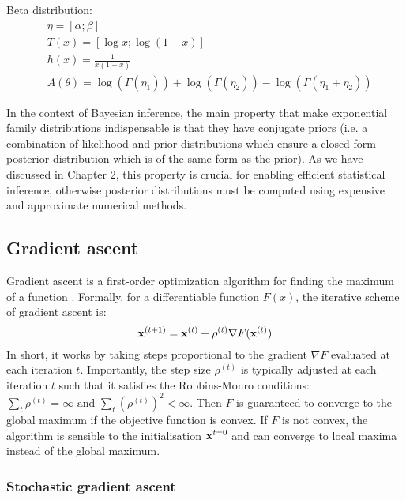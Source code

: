 Beta distribution:
\begin{align*}
	& \eta = [\alpha; \beta] \\
	& T(x) = [\log x; \log (1-x)] \\
	& h(x) = \frac{1}{x(1-x)} \\
	& A(\theta) = \log(\Gamma(\eta_1)) +\log(\Gamma(\eta_2)) - \log(\Gamma(\eta_1+\eta_2))
\end{align*}

In the context of Bayesian inference, the main property that make exponential family distributions indispensable is that they have conjugate priors (i.e. a combination of likelihood and prior distributions which ensure a closed-form posterior distribution which is of the same form as the prior). As we have discussed in Chapter 2, this property is crucial for enabling efficient statistical inference, otherwise posterior distributions must be computed using expensive and approximate numerical methods.



\subsection{Gradient ascent} \label{section:gradient_ascent}

Gradient ascent is a first-order optimization algorithm for finding the maximum of a function \cite{Bishop2006,Murphy}. Formally, for a differentiable function $F(x)$, the iterative scheme of gradient ascent is:
\begin{equation} \label{gradient_ascent}
	{\bf x}^{(t+1)} = {\bf x}^{(t)} + \rho^{(t)} \nabla F({\bf x}^{(t)})
\end{equation}
In short, it works by taking steps proportional to the gradient $\nabla F$ evaluated at each iteration $t$. 
Importantly, the step size $\rho^{(t)}$ is typically adjusted at each iteration $t$ such that it satisfies the Robbins-Monro conditions: $\sum_t \rho^{(t)} = \infty \text{ and } \sum_t (\rho^{(t)})^2 < \infty$. Then $F$ is guaranteed to converge to the global maximum \cite{Robbins-Monro1951} if the objective function is convex. If $F$ is not convex, the algorithm is sensible to the initialisation ${\bf x}^{t=0}$ and can converge to local maxima instead of the global maximum.


\subsubsection{Stochastic gradient ascent} \label{section:stochastic_gradient_ascent}

